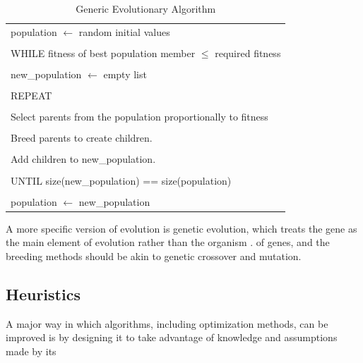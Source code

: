 	\begin{table}
		\caption{Generic Evolutionary Algorithm} \hline
		\label{tab:genericevultionaryalgorithm}
		\begin{tabular}{l} \\
		population \(\gets\) random initial values \\ \\
		WHILE fitness of best population member \(\leq\) required fitness \\ \\
			\tab new\_population \(\gets\) empty list\\ \\
			\tab REPEAT \\ \\
				\tab \tab Select parents from the population proportionally to fitness \\ \\
				\tab \tab Breed parents to create children. \\ \\
				\tab \tab Add children to new\_population. \\ \\
			\tab UNTIL size(new\_population) == size(population) \\ \\
			\tab population \(\gets\) new\_population \\
		\end{tabular}
		\hline
	\end{table}
	

A more specific version of evolution is genetic evolution, which treats the gene as the main element of evolution rather than the organism \cite{re:selfishgene}.  of genes, and the breeding methods should be akin to genetic crossover and mutation.  

\subsection{Heuristics} \label{sec:evolutionaryheuristics}
A major way in which algorithms, including optimization methods, can be improved is by designing it to take advantage of knowledge and assumptions made by its 

